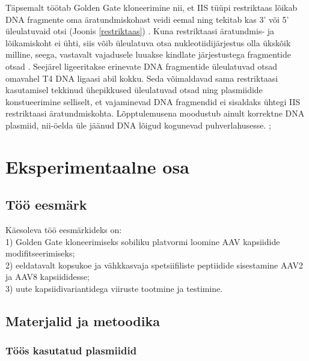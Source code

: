 \documentclass{trkut}%
\begin{document}
Täpsemalt töötab Golden Gate kloneerimine nii, et IIS tüüpi restriktaas lõikab DNA fragmente oma äratundmiskohast veidi eemal ning tekitab kas 3’ või 5’ üleulatuvaid otsi (Joonis \ref{restriktaas}) \parencite{restr}. Kuna restriktaasi äratundmis- ja lõikamiskoht ei ühti, siis võib üleulatuva otsa nukleotiidijärjestus olla ükskõik milline, seega, vastavalt vajadusele luuakse kindlate järjestustega fragmentide otsad \parencite{ggjoonis}. Seejärel ligeeritakse erinevate DNA fragmentide üleulatuvad otsad omavahel T4 DNA ligaasi abil kokku. Seda võimaldavad sama restriktaasi kasutamisel tekkinud ühepikkused üleulatuvad otsad ning plasmiidide konstueerimine selliselt, et vajaminevad DNA fragmendid ei sisaldaks ühtegi IIS restriktaasi äratundmiskohta. Lõpptulemusena moodustub ainult korrektne DNA plasmiid, nii-öelda üle jäänud DNA lõigud  kogunevad puhverlahusesse. \parencite{ggkloneerimine}; \parencite{ggkloneerimine_userguide}

\chapter{Eksperimentaalne osa}

\section{Töö eesmärk}

Käesoleva töö eesmärkideks on:\\
1) Golden Gate kloneerimiseks sobiliku platvormi loomine AAV kapsiidide modifitseerimiseks;\\
2) eeldatavalt kopsukoe ja vähkkasvaja spetsiifiliste peptiidide sisestamine AAV2 ja AAV8 kapsiididesse;\\
3) uute kapsiidivariantidega viiruste tootmine ja testimine. 

\section{Materjalid ja metoodika}

\subsection{Töös kasutatud plasmiidid}
\end{document}
